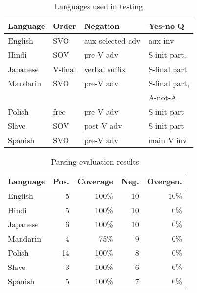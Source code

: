 \documentclass[11pt]{article}
\begin{document}
\begin{table}[ht]
\begin{center}
\small
\begin{tabular}{llll}
\hline
Language\footnotemark & Order & Negation & Yes-no Q\footnotemark \\ \hline
English  & SVO	      & aux-selected adv& aux inv \\
Hindi    & SOV        & pre-V adv 	& S-init part.\\
Japanese & V-final    & verbal suffix   & S-final part\\
Mandarin & SVO	      & pre-V adv	& S-final part,\\
         &            &                 &  A-not-A \\
Polish   & free	      & pre-V adv       & S-init part  \\
Slave    & SOV        & post-V adv	& S-init part \\
Spanish  & SVO	      & pre-V adv	& main V inv \\ \hline
\end{tabular}\vspace{-10pt}
\end{center}
\caption{Languages used in testing}
\label{testsuitetable}
\end{table}

\addtocounter{footnote}{-1}
\addtocounter{footnote}{1}

\begin{table}[ht]
\begin{center}
\small
\begin{tabular}{lrrrr}
\hline
Language & Pos. & Coverage & Neg. & Overgen. \\ \hline
English  & 5	     & 100\%	& 10 & 10\%\\
Hindi    & 5         & 100\% 	& 10 & 0\% \\
Japanese & 6         & 100\%    & 10 & 0\% \\
Mandarin & 4	     &  75\%	&  9 & 0\% \\
Polish   & 14	     & 100\%    &  8 & 0\% \\
Slave    & 3         & 100\%	&  6 & 0\% \\
Spanish  & 5         & 100\%	&  7 & 0\% \\ \hline
\end{tabular}\vspace{-10pt}
\end{center}
\caption{Parsing evaluation results}
\label{testresults}
\end{table}
\end{document}
